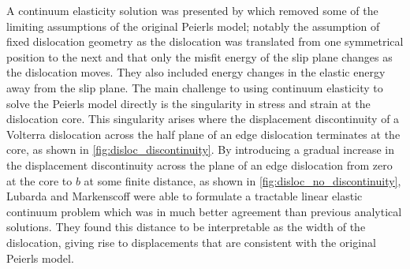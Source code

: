 A continuum elasticity solution was presented by \citet{Lubarda2007} which removed some of the limiting assumptions of the original Peierls model; notably the assumption of fixed dislocation geometry as the dislocation was translated from one symmetrical position to the next and that only the misfit energy of the slip plane changes as the dislocation moves. They also included energy changes in the elastic energy away from the slip plane. The main challenge to using continuum elasticity to solve the Peierls model directly is the singularity in stress and strain at the dislocation core. This singularity arises where the displacement discontinuity of a Volterra dislocation across the half plane of an edge dislocation terminates at the core, as shown in \autoref{fig:disloc_discontinuity}. By introducing a gradual increase in the displacement discontinuity across the plane of an edge dislocation from zero at the core to $b$ at some finite distance, as shown in \autoref{fig:disloc_no_discontinuity}, Lubarda and Markenscoff were able to formulate a tractable linear elastic continuum problem which was in much better agreement than previous analytical solutions. They found this distance to be interpretable as the width of the dislocation, giving rise to displacements that are consistent with the original Peierls model. 



